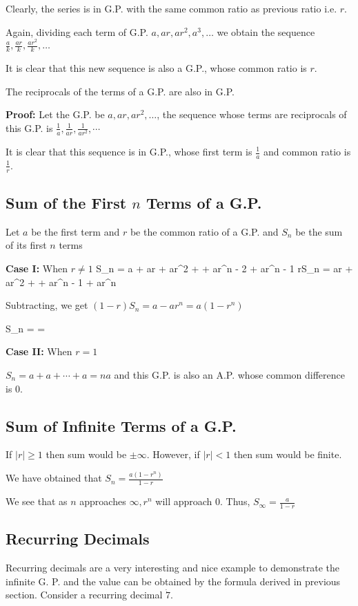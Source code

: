   Clearly, the series is in G.P. with the same common ratio as previous ratio i.e. $r$.

  Again, dividing each term of G.P. $a, ar, ar^2, a^3, \ldots$ we obtain the sequence $\frac{a}{k}, \frac{ar}{k}, \frac{ar^2}{k},
  \ldots$

  It is clear that this new sequence is also a G.P., whose common ratio is $r$.
\item The reciprocals of the terms of a G.P. are also in G.P.

  {\bf Proof:} Let the G.P. be $a, ar, ar^2, \ldots$, the sequence whose terms are reciprocals of this G.P. is $\frac{1}{a},
  \frac{1}{ar}, \frac{1}{ar^2}, \cdots$

  It is clear that this sequence is in G.P., whose first term is $\frac{1}{a}$ and common ratio is $\frac{1}{r}$.
\stopitemize

\subsection{Sum of the First $n$ Terms of a G.P.}
Let $a$ be the first term and $r$ be the common ratio of a G.P. and $S_n$ be the sum of its first $n$ terms

{\bf Case I:} When $r\neq 1$
\startformula S_n = a + ar + ar^2 + \cdots + ar^{n - 2} + ar^{n - 1}\stopformula
\startformula rS_n = ar + ar^2 + \cdots + ar^{n - 1} + ar^n\stopformula

Subtracting, we get $(1 - r)S_n = a - ar^n = a(1 - r^n)$

\startformula\therefore S_n =  = \stopformula

{\bf Case II:} When $r = 1$

$S_n = a + a + \cdots + a = na$ and this G.P. is also an A.P. whose common difference is $0$.

\subsection{Sum of Infinite Terms of a G.P.}
If $|r|\geq 1$ then sum would be $\pm\infty$. However, if $|r|< 1$ then sum would be finite.

We have obtained that $S_n = \frac{a(1 - r^n)}{1 - r}$

We see that as $n$ approaches $\infty, r^n$ will approach $0$. Thus, $S_\infty = \frac{a}{1 - r}$

\subsection{Recurring Decimals}
Recurring decimals are a very interesting and nice example to demonstrate the infinite G. P. and the value can be obtained by the
formula derived in previous section. Consider a recurring decimal $\dot{7}$.

